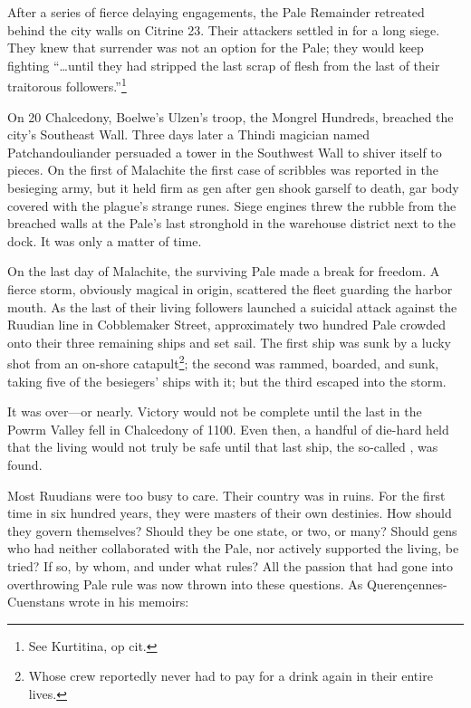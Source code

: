 \documentclass[12pt]{report}
\begin{document}
After a series of fierce delaying engagements, the Pale Remainder
retreated behind the city walls on Citrine 23.  Their attackers
settled in for a long siege.  They knew that surrender was not an
option for the Pale; they would keep fighting ``{\ldots}until they had
stripped the last scrap of flesh from the last of their traitorous
followers.''\footnote{See Kurtitina, op cit.}

On 20 Chalcedony, Boelwe's Ulzen's troop, the Mongrel Hundreds,
breached the city's Southeast Wall.  Three days later a Thindi
magician named Patchandouliander persuaded a tower in the Southwest
Wall to shiver itself to pieces.  On the first of Malachite the first
case of scribbles was reported in the besieging army, but it held firm
as gen after gen shook garself to death, gar body covered with the
plague's strange runes.  Siege engines threw the rubble from the
breached walls at the Pale's last stronghold in the warehouse district
next to the dock.  It was only a matter of time.

On the last day of Malachite, the surviving Pale made a break for
freedom.  A fierce storm, obviously magical in origin, scattered the
fleet guarding the harbor mouth.  As the last of their living
followers launched a suicidal attack against the Ruudian line in
Cobblemaker Street, approximately two hundred Pale crowded onto their
three remaining ships and set sail.  The first ship was sunk by a
lucky shot from an on-shore catapult\footnote{Whose crew reportedly
never had to pay for a drink again in their entire lives.}; the second
was rammed, boarded, and sunk, taking five of the besiegers' ships
with it; but the third escaped into the storm.

It was over---or nearly.  Victory would not be complete until the last
 in the Powrm Valley fell in Chalcedony of 1100.  Even
then, a handful of die-hard {\aemott} held that the living would not
truly be safe until that last ship, the so-called , was found.

Most Ruudians were too busy to care.  Their country was in ruins.  For
the first time in six hundred years, they were masters of their own
destinies.  How should they govern themselves?  Should they be one
state, or two, or many?  Should gens who had neither collaborated with
the Pale, nor actively supported the living, be tried?  If so, by
whom, and under what rules?  All the passion that had gone into
overthrowing Pale rule was now thrown into these questions.  As
Queren\c{c}ennes-Cuenstans wrote in his memoirs:
\end{document}
